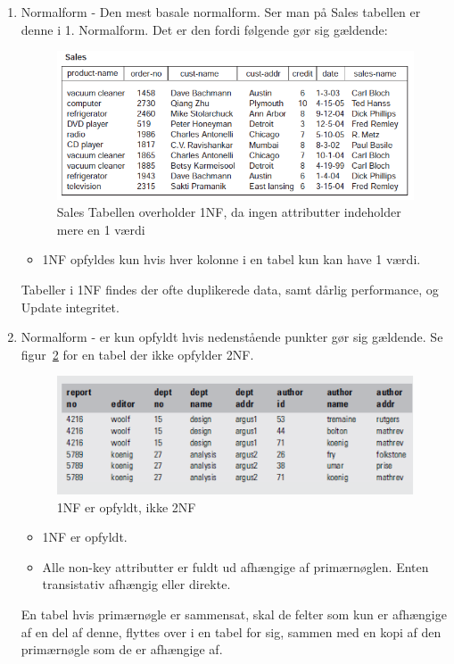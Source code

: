 \begin{enumerate}
	\item Normalform - Den mest basale normalform. Ser man på Sales tabellen er denne i 1. Normalform. Det er den fordi følgende gør sig gældende:
		\begin{figure}[H]
			\centering
			\includegraphics[width=0.7\linewidth]{figs/spm5/notNormalizedTable.PNG}
			\caption{Sales Tabellen overholder 1NF, da ingen attributter indeholder mere en 1 værdi}
			\label{fig:notNormalizedTable}
		\end{figure}
	\begin{itemize}
		\item 1NF opfyldes kun hvis hver kolonne i en tabel kun kan have 1 værdi.
	\end{itemize}
	Tabeller i 1NF findes der ofte duplikerede data, samt dårlig performance, og Update integritet.
	
	\item Normalform - er kun opfyldt hvis nedenstående punkter gør sig gældende. Se figur~\ref{fig:not2NF} for en tabel der ikke opfylder 2NF.
	
	\begin{figure}[H]
		\centering
		\includegraphics[width=0.7\linewidth]{figs/spm5/not2NF.PNG}
		\caption{1NF er opfyldt, ikke 2NF}
		\label{fig:not2NF}
	\end{figure}
	
	
	\begin{itemize}
		\item 1NF er opfyldt.
		\item Alle non-key attributter er fuldt ud afhængige af primærnøglen. Enten transistativ afhængig eller direkte.
	\end{itemize}
	
	En tabel hvis primærnøgle er sammensat, skal de felter som kun er afhængige af en del af denne, flyttes over i en tabel for sig, sammen med en kopi af den primærnøgle som de er afhængige af.
	

\end{enumerate}
